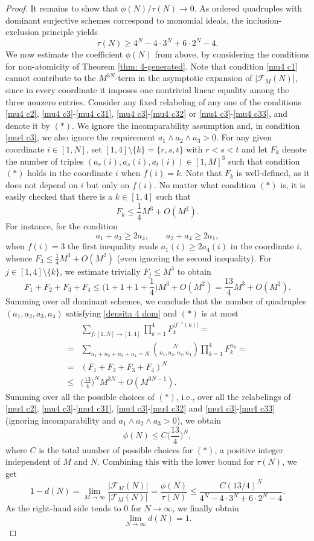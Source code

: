 \documentclass[a4paper,10pt,reqno]{amsart}
\theoremstyle{definition}
\theoremstyle{definition}
\begin{document}
\begin{proof}
    It remains to show that $\phi(N)/\tau(N)\to 0$. As ordered quadruples with dominant surjective schemes correspond to monomial ideals, the inclusion-exclusion principle yields
    \[ \tau(N)\ge 4^N-4\cdot3^N+6\cdot2^N-4. \]
    We now estimate the coefficient $\phi(N)$ from above, by considering the conditions for non-atomicity of Theorem \ref{thm: 4-generated}. Note that condition \ref{mu4 c1} cannot contribute to the $M^{3N}$-term in the asymptotic expansion of $\lvert \mathcal F_M(N)\rvert$, since in every coordinate it imposes one nontrivial linear equality among the three nonzero entries. Consider any fixed relabeling of any one of the conditions \ref{mu4 c2}, \ref{mu4 c3}-\ref{mu4 c31}, \ref{mu4 c3}-\ref{mu4 c32} or \ref{mu4 c3}-\ref{mu4 c33}, and denote it by $(\ast)$. We ignore the incomparability assumption and, in condition \ref{mu4 c3}, we also ignore the requirement $a_1\wedge a_2\wedge a_3> \underline 0$. For any given coordinate $i\in [1,N]$, set $[1,4]\setminus\{k\} = \{r,s,t\}$ with $r<s<t$ and let $F_k$ denote the number of triples $(a_r(i),a_s(i),a_t(i))\in [1,M]^3$ such that condition $(\ast)$ holds in the coordinate $i$ when $f(i)=k$. Note that $F_k$ is well-defined, as it does not depend on $i$ but only on $f(i)$. No matter what condition $(\ast)$ is, it is easily checked that there is a $k\in[1,4]$ such that
    \[ F_k \le \frac14 M^3+O(M^2).\]
    For instance, for the condition
    \[ a_1+a_3\ge 2a_4,\qquad a_2+a_4\ge 2a_1, \]
    when $f(i)=3$ the first inequality reads $a_1(i)\ge 2a_4(i)$ in the coordinate $i$, whence $F_3\le \frac14 M^3+O(M^2)$ (even ignoring the second inequality). For $j\in [1,4]\setminus\{k\}$, we estimate trivially $F_j\le M^3$ to obtain
    \[ F_1+F_2+F_3+F_4 \le \biggl(1+1+1+\frac14\biggr)M^3+O(M^2) = \frac{13}{4} M^3+O(M^2).\]
    Summing over all dominant schemes, we conclude that the number of quadruples $(a_1,a_2,a_3,a_4)$ satisfying \eqref{densita 4 dom} and $(\ast)$ is at most
    \begin{align*}
        &\sum_{f\colon [1,N]\to[1,4]} \prod_{k=1}^4 F_k^{\lvert f^{-1}(k)\rvert} = \\
        = &\sum_{n_1+n_2+n_3+n_4=N} \binom{N}{n_1,n_2,n_3,n_4} \prod_{k=1}^4 F_k^{n_k} = \\
        = &(F_1+F_2+F_3+F_4)^N \\
        \le &\biggl(\frac{13}{4}\biggr)^N M^{3N}+ O(M^{3N-1}).
    \end{align*}
     Summing over all the possible choices of $(\ast)$, i.e., over all the relabelings of \ref{mu4 c2}, \ref{mu4 c3}-\ref{mu4 c31}, \ref{mu4 c3}-\ref{mu4 c32} and \ref{mu4 c3}-\ref{mu4 c33} (ignoring incomparability and $a_1\wedge a_2\wedge a_3> \underline 0$), we obtain
     \[ \phi(N)\le C\biggl(\frac{13}{4}\biggr)^N,\]
     where $C$ is the total number of possible choices for $(\ast)$, a positive integer independent of $M$ and $N$. Combining this with the lower bound for $\tau(N)$, we get
     \[ 1-d(N) = \lim_{M\to\infty}\frac{|\mathcal F_M(N)|}{|\mathcal T_M(N)|} = \frac{\phi(N)}{\tau(N)} \le \frac{C(13/4)^N}{4^N-4\cdot3^N+6\cdot2^N-4}. \]
     As the right-hand side tends to $0$ for $N\to\infty$, we finally obtain
     \[ \lim_{N\to\infty}d(N)=1. \]
\end{proof}
\end{document}
